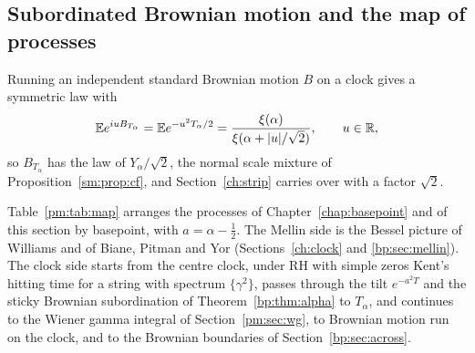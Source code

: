 \subsection{Subordinated Brownian motion and the map of processes}\label{pm:sec:map}

Running an independent standard Brownian motion $B$ on a clock gives a symmetric law with
\[
\mathbb{E} e^{iuB_{T_\alpha}}=\mathbb{E} e^{-u^2T_\alpha/2}=\frac{\xi(\alpha)}{\xi(\alpha+|u|/\sqrt2)},\qquad u\in\mathbb{R},
\]
so $B_{T_\alpha}$ has the law of $Y_\alpha/\sqrt2$, the normal scale mixture of Proposition~\ref{sm:prop:cf}, and Section~\ref{ch:strip} carries over with a factor $\sqrt2$.

Table~\ref{pm:tab:map} arranges the processes of Chapter~\ref{chap:basepoint} and of this section by basepoint, with $a=\alpha-\frac12$. The Mellin side is the Bessel picture of Williams \cite{Williams90} and of Biane, Pitman and Yor \cite{BPY01} (Sections~\ref{ch:clock} and \ref{bp:sec:mellin}). The clock side starts from the centre clock, under RH with simple zeros Kent's hitting time for a string with spectrum $\{\gamma^2\}$, passes through the tilt $e^{-a^2T}$ and the sticky Brownian subordination of Theorem~\ref{bp:thm:alpha} to $T_\alpha$, and continues to the Wiener gamma integral of Section~\ref{pm:sec:wg}, to Brownian motion run on the clock, and to the Brownian boundaries of Section~\ref{bp:sec:across}.

